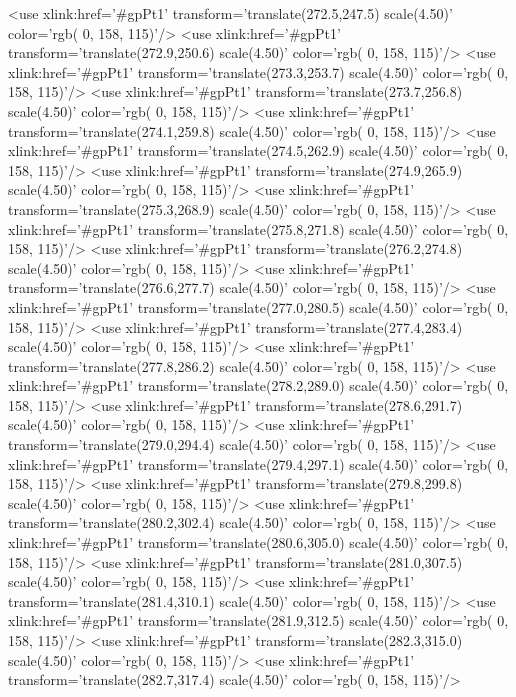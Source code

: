 	<use xlink:href='#gpPt1' transform='translate(272.5,247.5) scale(4.50)' color='rgb(  0, 158, 115)'/>
	<use xlink:href='#gpPt1' transform='translate(272.9,250.6) scale(4.50)' color='rgb(  0, 158, 115)'/>
	<use xlink:href='#gpPt1' transform='translate(273.3,253.7) scale(4.50)' color='rgb(  0, 158, 115)'/>
	<use xlink:href='#gpPt1' transform='translate(273.7,256.8) scale(4.50)' color='rgb(  0, 158, 115)'/>
	<use xlink:href='#gpPt1' transform='translate(274.1,259.8) scale(4.50)' color='rgb(  0, 158, 115)'/>
	<use xlink:href='#gpPt1' transform='translate(274.5,262.9) scale(4.50)' color='rgb(  0, 158, 115)'/>
	<use xlink:href='#gpPt1' transform='translate(274.9,265.9) scale(4.50)' color='rgb(  0, 158, 115)'/>
	<use xlink:href='#gpPt1' transform='translate(275.3,268.9) scale(4.50)' color='rgb(  0, 158, 115)'/>
	<use xlink:href='#gpPt1' transform='translate(275.8,271.8) scale(4.50)' color='rgb(  0, 158, 115)'/>
	<use xlink:href='#gpPt1' transform='translate(276.2,274.8) scale(4.50)' color='rgb(  0, 158, 115)'/>
	<use xlink:href='#gpPt1' transform='translate(276.6,277.7) scale(4.50)' color='rgb(  0, 158, 115)'/>
	<use xlink:href='#gpPt1' transform='translate(277.0,280.5) scale(4.50)' color='rgb(  0, 158, 115)'/>
	<use xlink:href='#gpPt1' transform='translate(277.4,283.4) scale(4.50)' color='rgb(  0, 158, 115)'/>
	<use xlink:href='#gpPt1' transform='translate(277.8,286.2) scale(4.50)' color='rgb(  0, 158, 115)'/>
	<use xlink:href='#gpPt1' transform='translate(278.2,289.0) scale(4.50)' color='rgb(  0, 158, 115)'/>
	<use xlink:href='#gpPt1' transform='translate(278.6,291.7) scale(4.50)' color='rgb(  0, 158, 115)'/>
	<use xlink:href='#gpPt1' transform='translate(279.0,294.4) scale(4.50)' color='rgb(  0, 158, 115)'/>
	<use xlink:href='#gpPt1' transform='translate(279.4,297.1) scale(4.50)' color='rgb(  0, 158, 115)'/>
	<use xlink:href='#gpPt1' transform='translate(279.8,299.8) scale(4.50)' color='rgb(  0, 158, 115)'/>
	<use xlink:href='#gpPt1' transform='translate(280.2,302.4) scale(4.50)' color='rgb(  0, 158, 115)'/>
	<use xlink:href='#gpPt1' transform='translate(280.6,305.0) scale(4.50)' color='rgb(  0, 158, 115)'/>
	<use xlink:href='#gpPt1' transform='translate(281.0,307.5) scale(4.50)' color='rgb(  0, 158, 115)'/>
	<use xlink:href='#gpPt1' transform='translate(281.4,310.1) scale(4.50)' color='rgb(  0, 158, 115)'/>
	<use xlink:href='#gpPt1' transform='translate(281.9,312.5) scale(4.50)' color='rgb(  0, 158, 115)'/>
	<use xlink:href='#gpPt1' transform='translate(282.3,315.0) scale(4.50)' color='rgb(  0, 158, 115)'/>
	<use xlink:href='#gpPt1' transform='translate(282.7,317.4) scale(4.50)' color='rgb(  0, 158, 115)'/>
